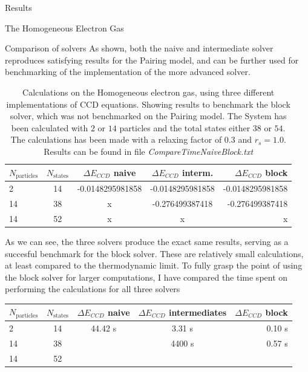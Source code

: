 \documentclass[twoside,english]{uiofysmaster}
\begin{document}
\begin{chapter}{Results}
\begin{section}{The Homogeneous Electron Gas}
		\begin{subsection}{Comparison of solvers}
			As shown, both the naive and intermediate solver reproduces satisfying results for the Pairing model, and can be further used for benchmarking of the implementation of the more advanced solver. 
			\begin{table}[H]
				\begin{center}
					\begin{tabular}[center]{l | c  c  c  r}
						$N_{\text{particles}}$ & $N_{\text{states}}$ & $ \Delta E_{CCD}$ naive  & $\Delta E_{CCD}$ interm. & $\Delta E_{CCD}$ block \\
						\hline
						2 & 14 & -0.0148295981858 & -0.0148295981858 & -0.0148295981858 \\
						14 & 38 & x & -0.276499387418 & -0.276499387418 \\
						14 & 52 & x & x & x 
					\end{tabular}
				\end{center}
				\caption{Calculations on the Homogeneous electron gas, using three different implementations of CCD equations. Showing results to benchmark the block solver, which was not benchmarked on the Pairing model. The System has been calculated with $2$ or $14$ particles and the total states either $38$ or $54$. The calculations has been made with a relaxing factor of $0.3$ and $r_s = 1.0$. Results can be found in file \textit{CompareTimeNaiveBlock.txt} \cite{WholmenGithub}}
				\label{table:CompareSolversHEG}
			\end{table}
			As we can see, the three solvers produce the exact same results, serving as a succesful benchmark for the block solver. These are relatively small calculations, at least compared to the thermodynamic limit. To fully grasp the point of using the block solver for larger computations, I have compared the time spent on performing the calculations for all three solvers
			\begin{table}[H]
				\begin{center}
					\begin{tabular}[center]{l | c  c  c  r}
						$N_{\text{particles}}$ & $N_{\text{states}}$ & $ \Delta E_{CCD}$ naive  & $\Delta E_{CCD}$ intermediates & $\Delta E_{CCD}$ block \\
						\hline
						2 & 14 & 44.42 s & 3.31 s & 0.10 s \\
						14 & 38 & & 4400 s & 0.57 s \\
						14 & 52 & & &  
					\end{tabular}

\end{center}
\end{table}
\end{subsection}
\end{section}
\end{chapter}
\end{document}
